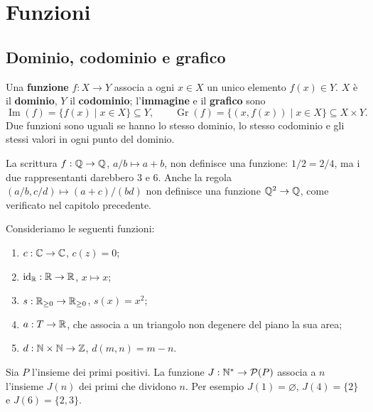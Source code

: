 \chapter{Funzioni}

\section{Dominio, codominio e grafico}
\begin{definizione}
Una \textbf{funzione} $f:X\to Y$ associa a ogni $x\in X$ un unico elemento $f(x)\in Y$. $X$ è il \textbf{dominio}, $Y$ il \textbf{codominio}; l'\textbf{immagine} e il \textbf{grafico} sono
\[
\operatorname{Im}(f)=\{f(x)\mid x\in X\}\subseteq Y,
\qquad \operatorname{Gr}(f)=\{(x,f(x))\mid x\in X\}\subseteq X\times Y.
\]
Due funzioni sono uguali se hanno lo stesso dominio, lo stesso codominio e gli stessi valori in ogni punto del dominio.
\end{definizione}

\begin{esempio}
La scrittura $f:\mathbb{Q}\to\mathbb{Q}$, $a/b\mapsto a+b$, non definisce una funzione: $1/2=2/4$, ma i due rappresentanti darebbero $3$ e $6$. Anche la regola $(a/b,c/d)\mapsto(a+c)/(bd)$ non definisce una funzione $\mathbb{Q}^2\to\mathbb{Q}$, come verificato nel capitolo precedente.
\end{esempio}

\begin{esempio}[Funzioni]
Consideriamo le seguenti funzioni:
\begin{enumerate}[label=\alph*)]
  \item $c:\mathbb{C}\to\mathbb{C}$, $c(z)=0$;
  \item $\operatorname{id}_{\mathbb{R}}:\mathbb{R}\to\mathbb{R}$, $x\mapsto x$;
  \item $s:\mathbb{R}_{\ge0}\to\mathbb{R}_{\ge0}$, $s(x)=x^2$;
  \item $a:T\to\mathbb{R}$, che associa a un triangolo non degenere del piano la sua area;
  \item $d:\mathbb{N}\times\mathbb{N}\to\mathbb{Z}$, $d(m,n)=m-n$.
\end{enumerate}
\end{esempio}

\begin{esempio}
Sia $P$ l’insieme dei primi positivi. La funzione $J:\mathbb{N}^*\to\mathcal P(P)$ associa a $n$ l’insieme $J(n)$ dei primi che dividono $n$. Per esempio $J(1)=\varnothing$, $J(4)=\{2\}$ e $J(6)=\{2,3\}$.
\end{esempio}

